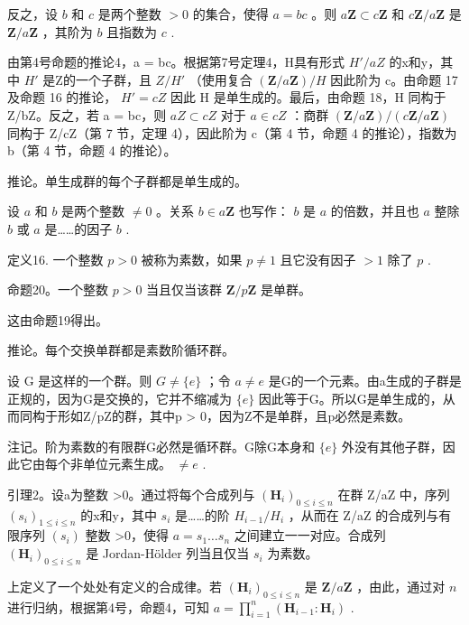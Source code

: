 反之，设 \(b\) 和 \(c\) 是两个整数 \(>0\) 的集合，使得 \(a = bc\) 。则 \(a\mathbf{Z} \subset c\mathbf{Z}\) 和 \(c\mathbf{Z}/a\mathbf{Z}\) 是 \(\mathbf{Z}/a\mathbf{Z}\) ，其阶为 \(b\) 且指数为 \(c\) .

由第4号命题的推论4，a = bc。根据第7号定理4，H具有形式 \(H'/aZ\) 的x和y，其中 \(H'\) 是Z的一个子群，且 \(Z/H'\) （使用复合 \((\mathbf{Z}/a\mathbf{Z})/H\) 因此阶为 c。由命题 17 及命题 16 的推论， \(H' = cZ\) 因此 H 是单生成的。最后，由命题 18，H 同构于 Z/bZ。反之，若 a = bc，则 \(aZ \subset cZ\) 对于 \(a \in cZ\) ：商群 \((\mathbf{Z}/a\mathbf{Z})/(c\mathbf{Z}/a\mathbf{Z})\) 同构于 Z/cZ（第 7 节，定理 4），因此阶为 c（第 4 节，命题 4 的推论），指数为 b（第 4 节，命题 4 的推论）。

推论。单生成群的每个子群都是单生成的。

设 \(a\) 和 \(b\) 是两个整数 \(\neq 0\) 。关系 \(b \in a\mathbf{Z}\) 也写作： \(b\) 是 \(a\) 的倍数，并且也 \(a\) 整除 \(b\) 或 \(a\) 是……的因子 \(b\) .

定义16. 一个整数 \(p > 0\) 被称为素数，如果 \(p \neq 1\) 且它没有因子 \(> 1\) 除了 \(p\) .

命题20。一个整数 \(p > 0\) 当且仅当该群 \(\mathbf{Z} / p\mathbf{Z}\) 是单群。

这由命题19得出。

推论。每个交换单群都是素数阶循环群。

设 G 是这样的一个群。则 \(G \neq \{e\}\) ；令 \(a \neq e\) 是G的一个元素。由a生成的子群是正规的，因为G是交换的，它并不缩减为 \(\{e\}\) 因此等于G。所以G是单生成的，从而同构于形如Z/pZ的群，其中p \textgreater{} 0，因为Z不是单群，且p必然是素数。

注记。阶为素数的有限群G必然是循环群。G除G本身和 \(\{e\}\) 外没有其他子群，因此它由每个非单位元素生成。 \(\neq e\) .

引理2。设a为整数 \textgreater0。通过将每个合成列与 \((\mathbf{H}_{i})_{0\leqslant i\leqslant n}\) 在群 Z/aZ 中，序列 \((s_{i})_{1\leqslant i\leqslant n}\) 的x和y，其中 \(s_{i}\) 是……的阶 \(H_{i-1}/H_{i}\) ，从而在 Z/aZ 的合成列与有限序列 \((s_{i})\) 整数 \textgreater0，使得 \(a=s_{1}\ldots s_{n}\) 之间建立一一对应。合成列 \((\mathbf{H}_{i})_{0\leqslant i\leqslant n}\) 是 Jordan-Hölder 列当且仅当 \(s_{i}\) 为素数。

上定义了一个处处有定义的合成律。若 \((\mathbf{H}_i)_{0\leqslant i\leqslant n}\) 是 \(\mathbf{Z} / a\mathbf{Z}\) ，由此，通过对 \(n\) 进行归纳，根据第4号，命题4，可知 \(a = \prod_{i=1}^{n} (\mathbf{H}_{i-1}:\mathbf{H}_i)\) .


